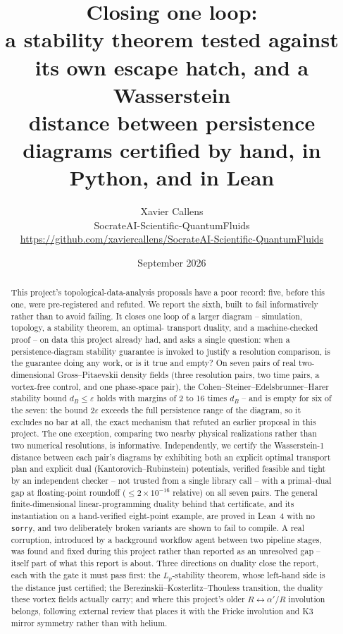 \documentclass[11pt,a4paper]{article}
\title{\textbf{Closing one loop:}\\
\large a stability theorem tested against its own escape hatch, and a Wasserstein\\
distance between persistence diagrams certified by hand, in Python, and in Lean}
\author{Xavier Callens\\
\small SocrateAI-Scientific-QuantumFluids\\
\small \url{https://github.com/xaviercallens/SocrateAI-Scientific-QuantumFluids}}
\date{September 2026}
\newcommand{\lean}[1]{\texttt{\small #1}}
\newcommand{\dB}{d_{B}}
\begin{document}
\maketitle

\begin{abstract}
\noindent
This project's topological-data-analysis proposals have a poor record: five, before this one, were
pre-registered and refuted. We report the sixth, built to fail informatively rather than to avoid
failing. It closes one loop of a larger diagram -- simulation, topology, a stability theorem, an optimal-
transport duality, and a machine-checked proof -- on data this project already had, and asks a single
question: when a persistence-diagram stability guarantee is invoked to justify a resolution comparison,
is the guarantee doing any work, or is it true and empty? On seven pairs of real two-dimensional
Gross--Pitaevskii density fields (three resolution pairs, two time pairs, a vortex-free control, and one
phase-space pair), the Cohen--Steiner--Edelsbrunner--Harer stability bound $\dB\le\varepsilon$ holds with
margins of 2 to 16 times $\dB$ -- and is empty for six of the seven: the bound $2\varepsilon$ exceeds the
full persistence range of the diagram, so it excludes no bar at all, the exact mechanism that refuted an
earlier proposal in this project. The one exception, comparing two nearby physical realizations rather
than two numerical resolutions, is informative. Independently, we certify the Wasserstein-1 distance
between each pair's diagrams by exhibiting both an explicit optimal transport plan and explicit dual
(Kantorovich--Rubinstein) potentials, verified feasible and tight by an independent checker -- not
trusted from a single library call -- with a primal--dual gap at floating-point roundoff
($\le\!2\times10^{-16}$ relative) on all seven pairs. The general finite-dimensional linear-programming
duality behind that certificate, and its instantiation on a hand-verified eight-point example, are
proved in Lean~4 with no \lean{sorry}, and two deliberately broken variants are shown to fail to compile.
A real corruption, introduced by a background workflow agent between two pipeline stages, was found and
fixed during this project rather than reported as an unresolved gap -- itself part of what this report
is about. Three directions on duality close the report, each with the gate it must pass first: the
$L_p$-stability theorem, whose left-hand side is the distance just certified; the
Berezinskii--Kosterlitz--Thouless transition, the duality these vortex fields actually carry; and where
this project's older $R\leftrightarrow\alpha'/R$ involution belongs, following external review that
places it with the Fricke involution and K3 mirror symmetry rather than with helium.
\end{abstract}
\end{document}
